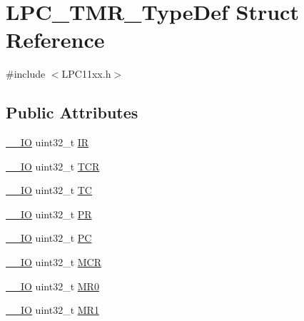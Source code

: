 \hypertarget{struct_l_p_c___t_m_r___type_def}{}\section{L\+P\+C\+\_\+\+T\+M\+R\+\_\+\+Type\+Def Struct Reference}
\label{struct_l_p_c___t_m_r___type_def}


{\ttfamily \#include $<$L\+P\+C11xx.\+h$>$}

\subsection*{Public Attributes}
\begin{DoxyCompactItemize}
\item 
\hyperlink{group___c_m_s_i_s__core__definitions_gaec43007d9998a0a0e01faede4133d6be}{\+\_\+\+\_\+\+IO} uint32\+\_\+t \hyperlink{group___l_p_c11xx___definitions_gaf16332cbc39630294982e798e7a8d63d}{IR}
\item 
\hyperlink{group___c_m_s_i_s__core__definitions_gaec43007d9998a0a0e01faede4133d6be}{\+\_\+\+\_\+\+IO} uint32\+\_\+t \hyperlink{group___l_p_c11xx___definitions_ga01eb339565185250e0451be2c008082b}{T\+CR}
\item 
\hyperlink{group___c_m_s_i_s__core__definitions_gaec43007d9998a0a0e01faede4133d6be}{\+\_\+\+\_\+\+IO} uint32\+\_\+t \hyperlink{group___l_p_c11xx___definitions_ga2a69dc7f40533cd8d997a6ddf5b02db3}{TC}
\item 
\hyperlink{group___c_m_s_i_s__core__definitions_gaec43007d9998a0a0e01faede4133d6be}{\+\_\+\+\_\+\+IO} uint32\+\_\+t \hyperlink{group___l_p_c11xx___definitions_gacda5f3b5ff58869fd5548ced27b32630}{PR}
\item 
\hyperlink{group___c_m_s_i_s__core__definitions_gaec43007d9998a0a0e01faede4133d6be}{\+\_\+\+\_\+\+IO} uint32\+\_\+t \hyperlink{group___l_p_c11xx___definitions_ga847806a474e59a84685cff99373556ac}{PC}
\item 
\hyperlink{group___c_m_s_i_s__core__definitions_gaec43007d9998a0a0e01faede4133d6be}{\+\_\+\+\_\+\+IO} uint32\+\_\+t \hyperlink{group___l_p_c11xx___definitions_ga898fc8d30de7119762aa61233661ded4}{M\+CR}
\item 
\hyperlink{group___c_m_s_i_s__core__definitions_gaec43007d9998a0a0e01faede4133d6be}{\+\_\+\+\_\+\+IO} uint32\+\_\+t \hyperlink{group___l_p_c11xx___definitions_ga40a2277815b2fc2275ece428e1de2366}{M\+R0}
\item 
\hyperlink{group___c_m_s_i_s__core__definitions_gaec43007d9998a0a0e01faede4133d6be}{\+\_\+\+\_\+\+IO} uint32\+\_\+t \hyperlink{group___l_p_c11xx___definitions_ga2b3e31390f522f8fc5f302901b16f40b}{M\+R1}

\end{DoxyCompactItemize}
